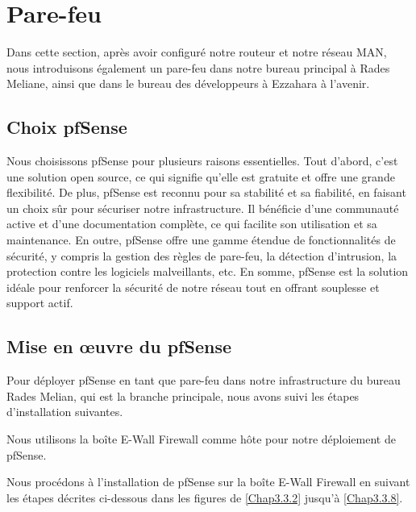 \section{Pare-feu}

Dans cette section, après avoir configuré notre routeur et notre réseau MAN, nous introduisons également un pare-feu dans notre bureau principal à Rades Meliane, ainsi que dans le bureau des développeurs à Ezzahara à l'avenir.


\subsection{Choix pfSense}

Nous choisissons pfSense pour plusieurs raisons essentielles. Tout d'abord, c'est une solution open source, ce qui signifie qu'elle est gratuite et offre une grande flexibilité. De plus, pfSense est reconnu pour sa stabilité et sa fiabilité, en faisant un choix sûr pour sécuriser notre infrastructure. Il bénéficie d'une communauté active et d'une documentation complète, ce qui facilite son utilisation et sa maintenance. En outre, pfSense offre une gamme étendue de fonctionnalités de sécurité, y compris la gestion des règles de pare-feu, la détection d'intrusion, la protection contre les logiciels malveillants, etc. En somme, pfSense est la solution idéale pour renforcer la sécurité de notre réseau tout en offrant souplesse et support actif.


\subsection{Mise en œuvre du pfSense}

Pour déployer pfSense en tant que pare-feu dans notre infrastructure du bureau Rades Melian, qui est la branche principale, nous avons suivi les étapes d'installation suivantes.


Nous utilisons la boîte E-Wall Firewall comme hôte pour notre déploiement de pfSense.


Nous procédons à l'installation de pfSense sur la boîte E-Wall Firewall en suivant les étapes décrites ci-dessous dans les figures de \ref{Chap3.3.2} jusqu'à \ref{Chap3.3.8}.

